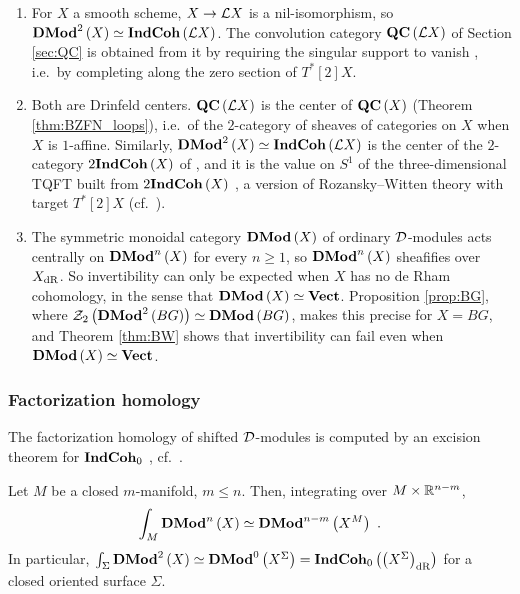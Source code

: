 \begin{rmk}
\label{rmk:DMod_center}
\begin{enumerate}
\item For $X$ a smooth scheme, $X\to\mathcal{L} X$ is a nil-isomorphism, so
$\mathbf{DMod}^2\left(X\right)\simeq\mathbf{IndCoh}\left(\mathcal{L} X\right)$. The convolution category
$\mathbf{QC}\left(\mathcal{L} X\right)$ of Section \ref{sec:QC} is obtained from it by requiring the singular
support to vanish \cite{AG:singsupp}, i.e.\ by completing along the zero section of
$T^*\left[2\right]X$.
\item Both are Drinfeld centers. $\mathbf{QC}\left(\mathcal{L} X\right)$ is the center of $\mathbf{QC}\left(X\right)$
(Theorem \ref{thm:BZFN_loops}), i.e.\ of the $2$-category of sheaves of categories on $X$ when
$X$ is $1$-affine. Similarly, $\mathbf{DMod}^2\left(X\right)\simeq\mathbf{IndCoh}\left(\mathcal{L} X\right)$ is the center of the
$2$-category $2\mathbf{IndCoh}\left(X\right)$ of \cite[Section 1]{Ste:IndCoh}, and it is the value on $S^1$ of
the three-dimensional TQFT built from $2\mathbf{IndCoh}\left(X\right)$ \cite[Corollary 1.3]{Ste:IndCoh}, a
version of Rozansky--Witten theory with target $T^*\left[2\right]X$ (cf.\ \cite[Section D.6]{BZSV}).
\item The symmetric monoidal category $\mathbf{DMod}\left(X\right)$ of ordinary $\mathcal{D}$-modules acts
centrally on $\mathbf{DMod}^n\left(X\right)$ for every $n\geq1$, so $\mathbf{DMod}^n\left(X\right)$ sheafifies over
$X_{\text{dR}}$. So invertibility can only be expected when $X$ has no de Rham cohomology, in the sense
that $\mathbf{DMod}\left(X\right)\simeq\mathbf{Vect}$. Proposition \ref{prop:BG}, where
$\mathcal{Z}_2\left(\mathbf{DMod}^2\left(BG\right)\right)\simeq\mathbf{DMod}\left(BG\right)$, makes this precise for $X=BG$,
and Theorem \ref{thm:BW} shows that invertibility can fail even when $\mathbf{DMod}\left(X\right)\simeq\mathbf{Vect}$.
\end{enumerate}
\end{rmk}

\subsubsection{Factorization homology}

The factorization homology of shifted $\mathcal{D}$-modules is computed by an excision theorem for
$\mathbf{IndCoh}_0$ \cite[Theorem 3.3.1]{HoLi}, cf.\ \cite[Claim 3.1]{Ber:Sph}.

\begin{prop}
\label{prop:int_DMod}
Let $M$ be a closed $m$-manifold, $m\leq n$. Then, integrating over $M\times\mathbb{R}^{n-m}$,
\begin{equation*}
\int_M\mathbf{DMod}^n\left(X\right)\simeq\mathbf{DMod}^{n-m}\left(X^M\right) \ .
\end{equation*}
In particular, $\int_\Sigma\mathbf{DMod}^2\left(X\right)\simeq\mathbf{DMod}^0\left(X^\Sigma\right)=
\mathbf{IndCoh}_0\left(\left(X^\Sigma\right)_{\text{dR}}\right)$ for a closed oriented surface $\Sigma$.
\end{prop}


